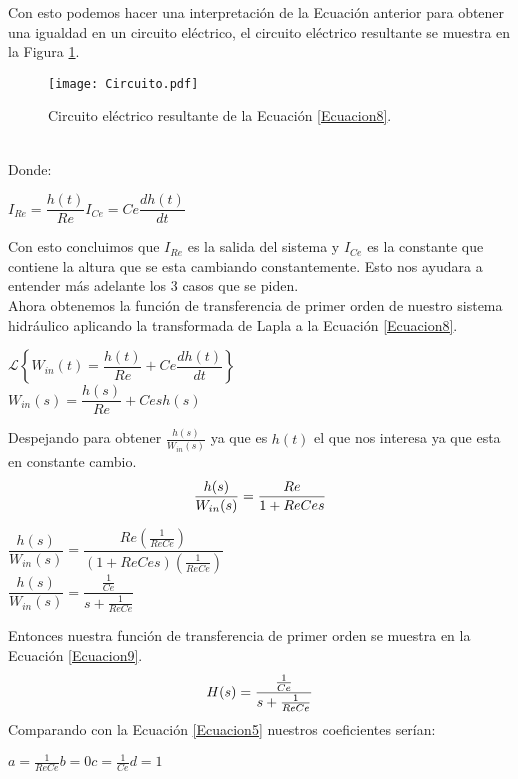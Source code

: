 \documentclass[12pt,a4paper]{article}
\begin{document}
Con esto podemos hacer una interpretación de la Ecuación anterior para obtener una igualdad en un circuito eléctrico, el circuito eléctrico resultante se muestra en la Figura \ref{Figura2}.\\
\begin{figure}[h!]
\centering
\texttt{[image: Circuito.pdf]}
\caption{Circuito eléctrico resultante de la Ecuación \ref{Ecuacion8}.}
\label{Figura2}
\end{figure}\\
Donde:
\begin{center}
$I_{Re}=\dfrac{h(t)}{Re}$\hspace{5cm}$I_{Ce}=Ce\dfrac{dh(t)}{dt}$
\end{center}
Con esto concluimos que $I_{Re}$ es la salida del sistema y $I_{Ce}$ es la constante que contiene la altura que se esta cambiando constantemente. Esto nos ayudara a entender más adelante los 3 casos que se piden.\\[12pt]
Ahora obtenemos la función de transferencia de primer orden de nuestro sistema hidráulico aplicando la transformada de Lapla a la Ecuación \ref{Ecuacion8}.
\begin{center}
$\mathcal{L}\left\lbrace W_{in}(t) = \dfrac{h(t)}{Re} + Ce\dfrac{dh(t)}{dt} \right\rbrace$\\[15pt]
$W_{in}(s) = \dfrac{h(s)}{Re} + Cesh(s)$
\end{center}
Despejando para obtener $\frac{h(s)}{W_{in}(s)}$ ya que es $h(t)$ el que nos interesa ya que esta en constante cambio.
\begin{equation}
\centering
\dfrac{h(s)}{W_{in}(s)} = \dfrac{Re}{1 + ReCes}
\label{Ecuacioncod}
\end{equation}
\begin{center}
$\dfrac{h(s)}{W_{in}(s)} = \dfrac{Re(\frac{1}{ReCe})}{(1 + ReCes)(\frac{1}{ReCe})}$\\[12pt]
$\dfrac{h(s)}{W_{in}(s)} = \dfrac{\frac{1}{Ce}}{s + \frac{1}{ReCe}}$
\end{center}
Entonces nuestra función de transferencia de primer orden se muestra en la Ecuación \ref{Ecuacion9}.
\begin{equation}
\centering
H(s) = \dfrac{\frac{1}{Ce}}{s + \frac{1}{ReCe}}
\label{Ecuacion9}
\end{equation}
Comparando con la Ecuación \ref{Ecuacion5} nuestros coeficientes serían:
\begin{center}
$a = \frac{1}{ReCe}$\hspace{3cm}$b = 0$\hspace{3cm}$c = \frac{1}{Ce}$\hspace{3cm}$d = 1$\end{center}
\newpage
\end{document}
